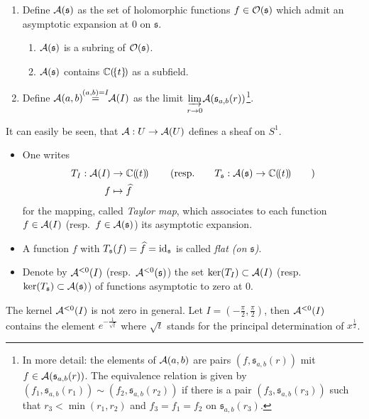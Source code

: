 \begin{defn}
  \begin{enumerate}
    \item Define $\mathcal{A}(\mathfrak{s})$ as the set of holomorphic functions
      $f\in\mathcal{O}(\mathfrak{s})$ which admit an asymptotic expansion at $0$ on
      $\mathfrak{s}$.
      \begin{s-rem}
        \begin{enumerate}
          \item
            $\mathcal{A}(\mathfrak{s})$ is a subring of $\mathcal{O}(\mathfrak{s})$.
          \item
            $\mathcal{A}(\mathfrak{s})$ contains $\mathbb{C}(\!\{t\}\!)$ as a subfield.
        \end{enumerate}
      \end{s-rem}
    \item Define $\mathcal{A}(a,b)\!\!\overset{(a,b)=I}{=}\!\!\mathcal{A}(I)$
      as the limit $\underset{r\to0}{\underrightarrow{\lim}}
      \mathcal{A}(\mathfrak{s}_{a,b}(r))$\footnote{In more detail: the
        elements of $\mathcal{A}(a,b)$ are pairs $(f,\mathfrak{s}_{a,b}(r))$ mit
        $f\in\mathcal{A}(\mathfrak{s}_{a,b}(r))$. The equivalence relation is given by
        $(f_1,\mathfrak{s}_{a,b}(r_1))\sim(f_2,\mathfrak{s}_{a,b}(r_2))$ if
      there is a pair $(f_3,\mathfrak{s}_{a,b}(r_3))$ such that
      $r_3<\min(r_1,r_2)$ and $f_3=f_1=f_2$ on $\mathfrak{s}_{a,b}(r_3)$.}.
  \end{enumerate}
\end{defn}
It can easily be seen, that $\mathcal{A}:U\to\mathcal{A}(U)$ defines a sheaf on $S^1$.

\begin{defn}
  \begin{itemize}
    \item One writes
      \begin{align*}
        T_{I}:\mathcal{A}(I)&\to\mathbb{C}(\!(t)\!)
        \qquad\left(\text{resp.}\qquad
        T_{\mathfrak{s}}:\mathcal{A}(\mathfrak{s})\to\mathbb{C}(\!(t)\!)\qquad\right)
      \\f&\mapsto\widehat f
      \end{align*}
      for the mapping, called \emph{Taylor map}, which associates to each
      function $f\in\mathcal{A}(I)$ (resp.\ $f\in\mathcal{A}(\mathfrak{s})$) its asymptotic
      expansion.
    \item A function $f$ with $T_{\mathfrak{s}}(f)=\widehat f=\operatorname{id}_{\mathfrak{s}}$
      is called \emph{flat (on $\mathfrak{s}$)}. \TODO[resp]
    \item Denote by $\mathcal{A}^{<0}(I)$ (resp.\ $\mathcal{A}^{<0}(\mathfrak{s})$) the set
      $\ker(T_{I})\subset\mathcal{A}(I)$ (resp.\
      $\ker(T_{\mathfrak{s}})\subset\mathcal{A}(\mathfrak{s})$) of functions asymptotic
      to zero at $0$.
  \end{itemize}
\end{defn}
The kernel $\mathcal{A}^{<0}(I)$ is not zero in general.
Let $I=\left(-\frac{\pi}{2},\frac{\pi}{2}\right)$, then $\mathcal{A}^{<0}(I)$ contains
the element $e^{-\frac{1}{\sqrt{t}}}$ where $\sqrt{t}$ stands for the principal
determination of $x^{\frac{1}{2}}$.

